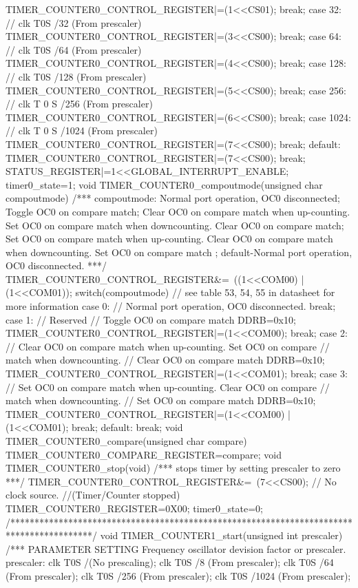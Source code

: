 \begin{verbatimtab}
{{{			TIMER_COUNTER0_CONTROL_REGISTER|=(1<<CS01);
			break;
			case 32: // clk T0S /32 (From prescaler)
			TIMER_COUNTER0_CONTROL_REGISTER|=(3<<CS00);
			break;
			case 64: // clk T0S /64 (From prescaler)
			TIMER_COUNTER0_CONTROL_REGISTER|=(4<<CS00);
			break;
			case 128: // clk T0S /128 (From prescaler)
			TIMER_COUNTER0_CONTROL_REGISTER|=(5<<CS00);
			break;
			case 256: // clk T 0 S /256 (From prescaler)
			TIMER_COUNTER0_CONTROL_REGISTER|=(6<<CS00);
			break;
			case 1024: // clk T 0 S /1024 (From prescaler)
			TIMER_COUNTER0_CONTROL_REGISTER|=(7<<CS00);
			break;
			default:
			TIMER_COUNTER0_CONTROL_REGISTER|=(7<<CS00);
			break;
		}
		STATUS_REGISTER|=1<<GLOBAL_INTERRUPT_ENABLE;
		timer0_state=1;
	}	
}
void TIMER_COUNTER0_compoutmode(unsigned char compoutmode)
/***
compoutmode: Normal port operation, OC0 disconnected;
Toggle OC0 on compare match; 
Clear OC0 on compare match when up-counting. Set OC0 on compare match when downcounting.
Clear OC0 on compare match; Set OC0 on compare match when up-counting.
Clear OC0 on compare match when downcounting. Set OC0 on compare match ;
default-Normal port operation, OC0 disconnected.
***/
{
	TIMER_COUNTER0_CONTROL_REGISTER&=~((1<<COM00) | (1<<COM01));
	switch(compoutmode){ // see table 53, 54, 55 in datasheet for more information
		case 0: // Normal port operation, OC0 disconnected.
		break;
		case 1: // Reserved
		// Toggle OC0 on compare match
		DDRB=0x10;
		TIMER_COUNTER0_CONTROL_REGISTER|=(1<<COM00);
		break;
		case 2: // Clear OC0 on compare match when up-counting. Set OC0 on compare
		// match when downcounting.
		// Clear OC0 on compare match
		DDRB=0x10;
		TIMER_COUNTER0_CONTROL_REGISTER|=(1<<COM01);
		break;
		case 3: // Set OC0 on compare match when up-counting. Clear OC0 on compare
		// match when downcounting.
		// Set OC0 on compare match
		DDRB=0x10;
		TIMER_COUNTER0_CONTROL_REGISTER|=(1<<COM00) | (1<<COM01);
		break;
		default:
		break;
	}
}
void TIMER_COUNTER0_compare(unsigned char compare)
{
	TIMER_COUNTER0_COMPARE_REGISTER=compare;
}
void TIMER_COUNTER0_stop(void)
/***
stops timer by setting prescaler to zero
***/
{
	TIMER_COUNTER0_CONTROL_REGISTER&=~(7<<CS00); // No clock source.
	//(Timer/Counter stopped)
	TIMER_COUNTER0_REGISTER=0X00;
	timer0_state=0;
}
/*****************************************************************************************/
void TIMER_COUNTER1_start(unsigned int prescaler)
/***
PARAMETER SETTING
Frequency oscillator devision factor or prescaler.
prescaler: clk T0S /(No prescaling); clk T0S /8 (From prescaler);
clk T0S /64 (From prescaler);
clk T0S /256 (From prescaler); clk T0S /1024 (From prescaler);

\end{verbatimtab}
